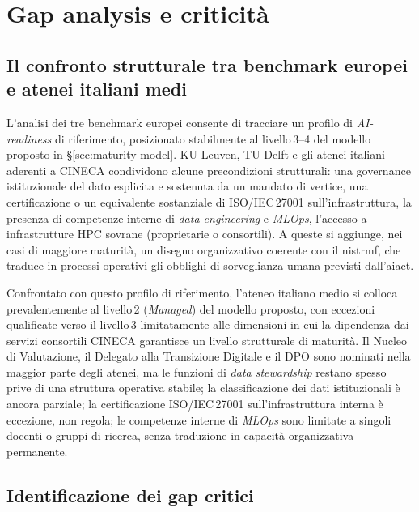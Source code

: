 \section{Gap analysis e criticità}
\label{sec:gap-analysis}

\subsection{Il confronto strutturale tra benchmark europei e atenei italiani medi}

L'analisi dei tre benchmark europei consente di tracciare un profilo di
\textit{AI-readiness} di riferimento, posizionato stabilmente al livello\,3--4 del
modello proposto in \S\ref{sec:maturity-model}. KU Leuven, TU Delft e gli atenei
italiani aderenti a CINECA condividono alcune precondizioni strutturali: una governance
istituzionale del dato esplicita e sostenuta da un mandato di vertice, una certificazione
o un equivalente sostanziale di ISO/IEC\,27001 sull'infrastruttura, la presenza di
competenze interne di \textit{data engineering} e \textit{MLOps}, l'accesso a
infrastrutture HPC sovrane (proprietarie o consortili). A queste si aggiunge, nei casi di
maggiore maturità, un disegno organizzativo coerente con il \gls{nistrmf}, che traduce in
processi operativi gli obblighi di sorveglianza umana previsti dall'\gls{aiact}.

Confrontato con questo profilo di riferimento, l'ateneo italiano medio si colloca
prevalentemente al livello\,2 (\textit{Managed}) del modello proposto, con eccezioni
qualificate verso il livello\,3 limitatamente alle dimensioni in cui la dipendenza dai
servizi consortili CINECA garantisce un livello strutturale di maturità. Il Nucleo di
Valutazione, il Delegato alla Transizione Digitale e il DPO sono nominati nella maggior
parte degli atenei, ma le funzioni di \textit{data stewardship} restano spesso prive di
una struttura operativa stabile; la classificazione dei dati istituzionali è ancora
parziale; la certificazione ISO/IEC\,27001 sull'infrastruttura interna è eccezione,
non regola; le competenze interne di \textit{MLOps} sono limitate a singoli docenti o
gruppi di ricerca, senza traduzione in capacità organizzativa permanente.

\subsection{Identificazione dei gap critici}

